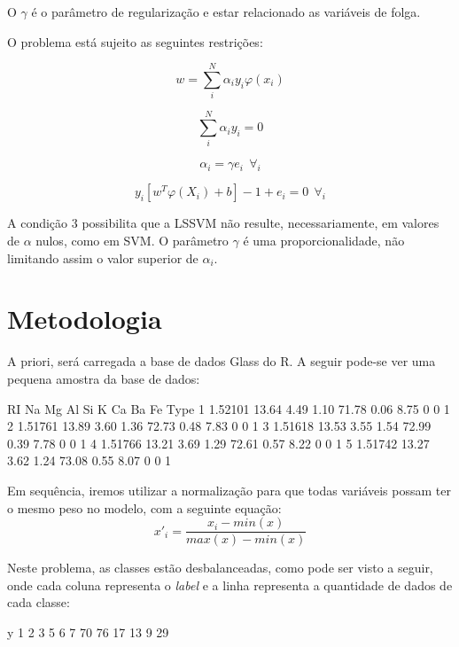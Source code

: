\documentclass[12pt]{article}
\begin{document}
  \par O $\gamma$ é o parâmetro de regularização e estar relacionado as variáveis de folga.
  
  \par O problema está sujeito as seguintes restrições:
  
\begin{equation}
  w = \sum_{i}^{N} \alpha_iy_i\varphi(x_i)
\end{equation}

\begin{equation}
  \sum_{i}^{N} \alpha_iy_i = 0
\end{equation}

\begin{equation}
  \alpha_i = \gamma e_i \ \ \forall_i
\end{equation}

\begin{equation}
y_i[w^T\varphi(X_i)+b]-1 + e_i = 0 \ \ \forall_i
\end{equation}

  \par A condição 3 possibilita que a LSSVM não resulte, necessariamente, em valores de $\alpha$ nulos, como em SVM. O parâmetro $\gamma$ é uma proporcionalidade, não limitando assim o valor superior de $\alpha_i$.
  

\section{Metodologia}

  \par A priori, será carregada a base de dados Glass do R. A seguir pode-se ver uma pequena amostra da base de dados:
\begin{Schunk}
\begin{Soutput}
       RI    Na   Mg   Al    Si    K   Ca Ba Fe Type
1 1.52101 13.64 4.49 1.10 71.78 0.06 8.75  0  0    1
2 1.51761 13.89 3.60 1.36 72.73 0.48 7.83  0  0    1
3 1.51618 13.53 3.55 1.54 72.99 0.39 7.78  0  0    1
4 1.51766 13.21 3.69 1.29 72.61 0.57 8.22  0  0    1
5 1.51742 13.27 3.62 1.24 73.08 0.55 8.07  0  0    1
\end{Soutput}
\end{Schunk}

  \par Em sequência, iremos utilizar a normalização para que todas variáveis possam ter o mesmo peso no modelo, com a seguinte equação:
\begin{equation}
x'_{i} = \frac{x_i - min(x)}{max(x) - min(x)}
\end{equation}
  \par Neste problema, as classes estão desbalanceadas, como pode ser visto a seguir, onde cada coluna representa o \textit{label} e a linha representa a quantidade de dados de cada classe:
\begin{Schunk}
\begin{Soutput}
y
 1  2  3  5  6  7 
70 76 17 13  9 29 
\end{Soutput}
\end{Schunk}
\end{document}
